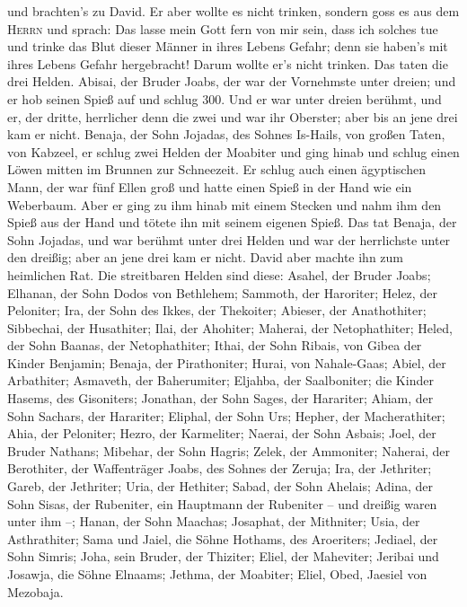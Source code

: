 und brachten's zu David. Er aber wollte es nicht trinken, sondern goss
es aus dem \textsc{Herrn}  und sprach: Das lasse mein
Gott fern von mir sein, dass ich solches tue und trinke das Blut dieser
Männer in ihres Lebens Gefahr; denn sie haben's mit ihres Lebens Gefahr
hergebracht! Darum wollte er's nicht trinken. Das taten die drei Helden.
 Abisai, der Bruder Joabs, der war der Vornehmste unter
dreien; und er hob seinen Spieß auf und schlug 300. Und er war unter
dreien berühmt,  und er, der dritte, herrlicher denn die
zwei und war ihr Oberster; aber bis an jene drei kam er nicht.
 Benaja, der Sohn Jojadas, des Sohnes Is-Hails, von
großen Taten, von Kabzeel, er schlug zwei Helden der Moabiter und ging
hinab und schlug einen Löwen mitten im Brunnen zur Schneezeit.
 Er schlug auch einen ägyptischen Mann, der war fünf
Ellen groß und hatte einen Spieß in der Hand wie ein Weberbaum. Aber er
ging zu ihm hinab mit einem Stecken und nahm ihm den Spieß aus der Hand
und tötete ihn mit seinem eigenen Spieß.  Das tat Benaja,
der Sohn Jojadas, und war berühmt unter drei Helden  und
war der herrlichste unter den dreißig; aber an jene drei kam er nicht.
David aber machte ihn zum heimlichen Rat.  Die
streitbaren Helden sind diese: Asahel, der Bruder Joabs; Elhanan, der
Sohn Dodos von Bethlehem;  Sammoth, der Haroriter; Helez,
der Peloniter;  Ira, der Sohn des Ikkes, der Thekoiter;
Abieser, der Anathothiter;  Sibbechai, der Husathiter;
Ilai, der Ahohiter;  Maherai, der Netophathiter; Heled,
der Sohn Baanas, der Netophathiter;  Ithai, der Sohn
Ribais, von Gibea der Kinder Benjamin; Benaja, der Pirathoniter;
 Hurai, von Nahale-Gaas; Abiel, der Arbathiter;
 Asmaveth, der Baherumiter; Eljahba, der Saalboniter;
 die Kinder Hasems, des Gisoniters; Jonathan, der Sohn
Sages, der Harariter;  Ahiam, der Sohn Sachars, der
Harariter; Eliphal, der Sohn Urs;  Hepher, der
Macherathiter; Ahia, der Peloniter;  Hezro, der
Karmeliter; Naerai, der Sohn Asbais;  Joel, der Bruder
Nathans; Mibehar, der Sohn Hagris;  Zelek, der Ammoniter;
Naherai, der Berothiter, der Waffenträger Joabs, des Sohnes der Zeruja;
 Ira, der Jethriter; Gareb, der Jethriter;
 Uria, der Hethiter; Sabad, der Sohn Ahelais;
 Adina, der Sohn Sisas, der Rubeniter, ein Hauptmann der
Rubeniter -- und dreißig waren unter ihm --;  Hanan, der
Sohn Maachas; Josaphat, der Mithniter;  Usia, der
Asthrathiter; Sama und Jaiel, die Söhne Hothams, des Aroeriters;
 Jediael, der Sohn Simris; Joha, sein Bruder, der
Thiziter;  Eliel, der Maheviter; Jeribai und Josawja, die
Söhne Elnaams; Jethma, der Moabiter;  Eliel, Obed,
Jaesiel von Mezobaja.

